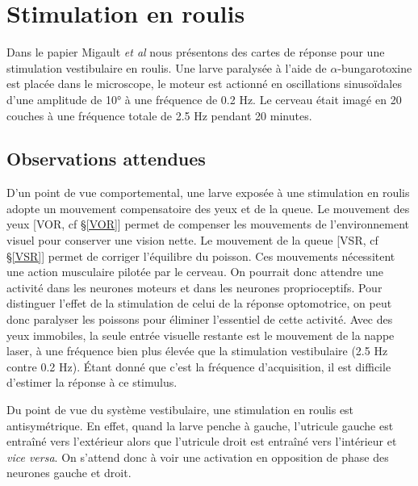


\section{Stimulation en roulis}

Dans le papier Migault \emph{et al} \cite{migault_whole-brain_2018} nous présentons des cartes de réponse pour une stimulation vestibulaire en roulis. Une larve paralysée à l'aide de $\alpha$-bungarotoxine est placée dans le microscope, le moteur est actionné en oscillations sinusoïdales d'une amplitude de 10° à une fréquence de 0.2 Hz. Le cerveau était imagé en 20 couches à une fréquence totale de 2.5 Hz pendant 20 minutes.


\subsection{Observations attendues}

D'un point de vue comportemental, une larve exposée à une stimulation en roulis adopte un mouvement compensatoire des yeux et de la queue. Le mouvement des yeux [VOR, cf §\ref{VOR}] permet de compenser les mouvements de l'environnement visuel pour conserver une vision nette. Le mouvement de la queue [VSR, cf §\ref{VSR}] permet de corriger l'équilibre du poisson. Ces mouvements nécessitent une action musculaire pilotée par le cerveau. On pourrait donc attendre une activité dans les neurones moteurs et dans les neurones proprioceptifs. Pour distinguer l'effet de la stimulation de celui de la réponse optomotrice, on peut donc paralyser les poissons pour éliminer l'essentiel de cette activité.
Avec des yeux immobiles, la seule entrée visuelle restante est le mouvement de la nappe laser, à une fréquence bien plus élevée que la stimulation vestibulaire (2.5 Hz contre 0.2 Hz). Étant donné que c'est la fréquence d'acquisition, il est difficile d'estimer la réponse à ce stimulus.

Du point de vue du système vestibulaire, une stimulation en roulis est antisymétrique. En effet, quand la larve penche à gauche, l'utricule gauche est entraîné vers l'extérieur alors que l'utricule droit est entraîné vers l'intérieur et \emph{vice versa}. On s'attend donc à voir une activation en opposition de phase des neurones gauche et droit.

